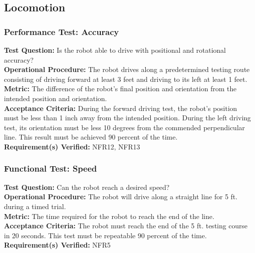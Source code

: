 
\subsection{Locomotion}
\label{sec:verification_locomotion}

\subsubsection{Performance Test: Accuracy}
\label{test:locomotion_pt_accuracy}
\textbf{Test Question:} Is the robot able to drive with positional and rotational accuracy?\\
\textbf{Operational Procedure:} The robot drives along a predetermined testing route consisting of driving forward at least 3 feet and driving to its left at least 1 feet.\\
\textbf{Metric:} The difference of the robot's final position and orientation from the intended position and orientation. \\
\textbf{Acceptance Criteria:} During the forward driving test, the robot's position must be less than 1 inch away from the intended position. During the left driving test, its orientation must be less 10 degrees from the commended perpendicular line. This result must be achieved 90 percent of the time.\\
\textbf{Requirement(s) Verified:} NFR12, NFR13 \\

\subsubsection{Functional Test: Speed}
\label{test:locomotion_ft_speed}
\textbf{Test Question:} Can the robot reach a desired speed? \\
\textbf{Operational Procedure:} The robot will drive along a straight line for 5 ft. during a timed trial.\\
\textbf{Metric:} The time required for the robot to reach the end of the line.\\
\textbf{Acceptance Criteria:} The robot must reach the end of the 5 ft. testing course in 20 seconds. This test must be repeatable 90 percent of the time. \\
\textbf{Requirement(s) Verified:} NFR5 \\

